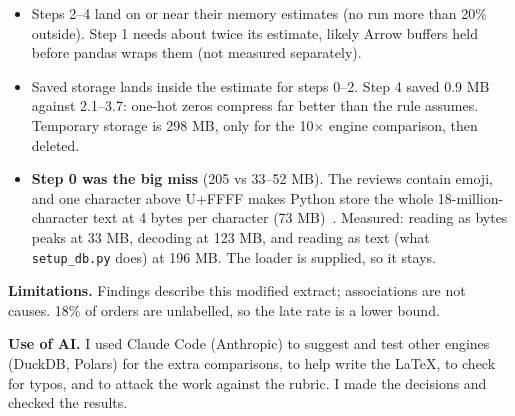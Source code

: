 \documentclass[11pt,a4paper]{article}
\newcommand{\file}[1]{\texttt{#1}}
\begin{document}
\begin{itemize}
  \item Steps 2--4 land on or near their memory estimates (no run more than 20\% outside). Step 1 needs about twice its estimate, likely Arrow buffers held before pandas wraps them (not measured separately).
  \item Saved storage lands inside the estimate for steps 0--2. Step 4 saved 0.9 MB against 2.1--3.7: one-hot zeros compress far better than the rule assumes. Temporary storage is 298 MB, only for the 10$\times$ engine comparison, then deleted.
  \item \textbf{Step 0 was the big miss} (205 vs 33--52 MB). The reviews contain emoji, and one character above U+FFFF makes Python store the whole 18-million-character text at 4 bytes per character (73 MB)~\cite{pep393}. Measured: reading as bytes peaks at 33 MB, decoding at 123 MB, and reading as text (what \file{setup\_db.py} does) at 196 MB. The loader is supplied, so it stays.
\end{itemize}

\textbf{Limitations.} Findings describe this modified extract; associations are not causes. 18\% of orders are unlabelled, so the late rate is a lower bound.

\textbf{Use of AI.} I used Claude Code (Anthropic) to suggest and test other engines (DuckDB, Polars) for the extra comparisons, to help write the LaTeX, to check for typos, and to attack the work against the rubric. I made the decisions and checked the results.
\end{document}
